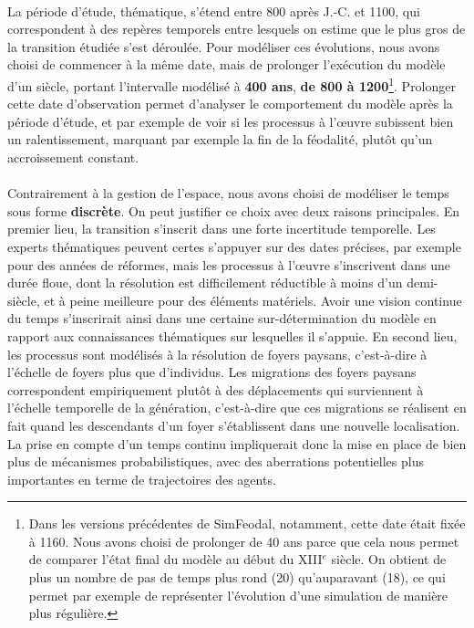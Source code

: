 \paragraph[Durée]{} La période d'étude, thématique, s'étend entre 800 après J.-C. et 1100, qui correspondent à des repères temporels entre lesquels on estime que le plus gros de la transition étudiée s'est déroulée.
Pour modéliser ces évolutions, nous avons choisi de commencer à la même date, mais de prolonger l'exécution du modèle d'un siècle, portant l'intervalle modélisé à \textbf{400 ans}, \textbf{de 800 à 1200}\footnote{
	Dans les versions précédentes de SimFeodal, \textcite{cura_transition_2017} notamment, cette date était fixée à 1160.
	Nous avons choisi de prolonger de 40 ans parce que cela nous permet de comparer l'état final du modèle au début du XIII$^e$ siècle.
	On obtient de plus un nombre de pas de temps plus \og rond\fg{} (20) qu'auparavant (18), ce qui permet par exemple de représenter l'évolution d'une simulation de manière plus régulière.
}.
Prolonger cette date d'observation permet d'analyser le comportement du modèle après la période d'étude, et par exemple de voir si les processus à l'œuvre subissent bien un ralentissement, marquant par exemple la fin de la féodalité, plutôt qu'un accroissement constant.

\paragraph[Discret]{} Contrairement à la gestion de l'espace, nous avons choisi de modéliser le temps sous forme \textbf{discrète}.
On peut justifier ce choix avec deux raisons principales.
En premier lieu, la transition s'inscrit dans une forte incertitude temporelle. 
Les experts thématiques peuvent certes s'appuyer sur des dates précises, par exemple pour des années de réformes, mais les processus à l'œuvre s'inscrivent dans une durée floue, dont la résolution est difficilement réductible à moins d'un demi-siècle, et à peine meilleure pour des éléments matériels.
Avoir une vision continue du temps s'inscrirait ainsi dans une certaine sur-détermination du modèle en rapport aux connaissances thématiques sur lesquelles il s'appuie.
En second lieu, les processus sont modélisés à la résolution de \og foyers paysans\fg{}, c'est-à-dire à l'échelle de foyers plus que d'individus.
Les migrations des foyers paysans correspondent empiriquement plutôt à des déplacements qui surviennent à l'échelle temporelle de la génération, c'est-à-dire que ces migrations se réalisent en fait quand les descendants d'un foyer s'établissent dans une nouvelle localisation.
La prise en compte d'un temps continu impliquerait donc la mise en place de bien plus de mécanismes probabilistiques, avec des aberrations potentielles plus importantes en terme de trajectoires des agents.

